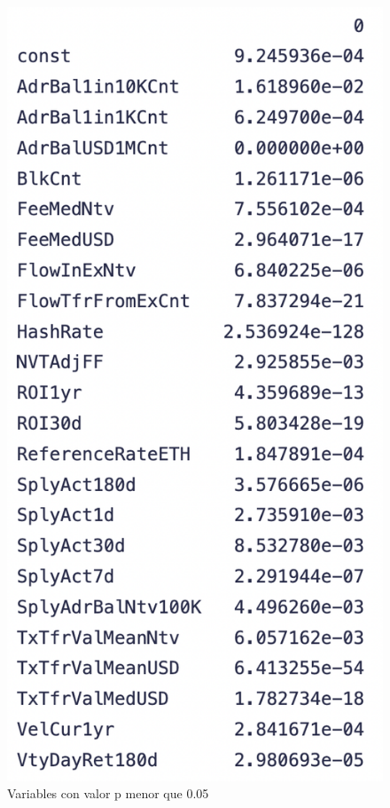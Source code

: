 \begin{figure}
	\centering
	\includegraphics[scale=0.5]{Chapter5/p-val.png}
	\caption{Variables con valor p menor que 0.05}
	\label{fig11}
\end{figure}

